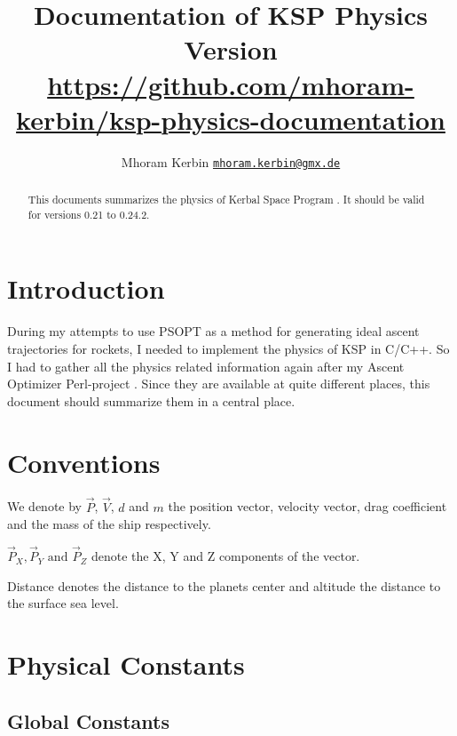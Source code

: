 \documentclass[11pt]{article}
\newcommand{\oa}[1]{\overrightarrow{#1}}
\newcommand{\Pos}{\oa{P}}
\newcommand{\Vel}{\oa{V}}
\begin{document}
\title{Documentation of KSP Physics\\\small{Version }\\\vspace{1 em}\url{https://github.com/mhoram-kerbin/ksp-physics-documentation}}
\author {Mhoram Kerbin \href{mailto:mhoram.kerbin@gmx.de}{\nolinkurl{mhoram.kerbin@gmx.de}}}

\maketitle

\begin{abstract}

  This documents summarizes the physics of Kerbal Space Program
  \cite{KSP}. It should be valid for versions 0.21 to 0.24.2.

\end{abstract}

\tableofcontents

\section{Introduction}

During my attempts to use PSOPT as a method for generating ideal
ascent trajectories for rockets, I needed to implement the physics of
KSP in C/C++. So I had to gather all the physics related information
again after my Ascent Optimizer Perl-project \cite{PAO}. Since they
are available at quite different places, this document should
summarize them in a central place.

\section{Conventions}

We denote by $\Pos$, $\Vel$, $d$ and $m$ the position vector, velocity
vector, drag coefficient and the mass of the ship respectively.

$\Pos_X, \Pos_Y \textrm{ and } \Pos_Z$ denote the X, Y and Z
components of the vector.

Distance denotes the distance to the planets center and altitude the
distance to the surface sea level.

\section{Physical Constants}


\subsection{Global Constants}
\end{document}
